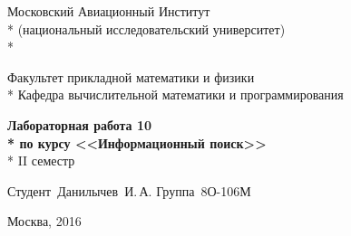 \begin{titlepage}

\newpage

\begin{center}
Московский Авиационный Институт \\*
(национальный исследовательский университет) \\*

\vspace{2em}

Факультет прикладной математики и физики \\*
Кафедра вычислительной математики и программирования

\vspace{20em}

\Large \textbf{Лабораторная работа 10 \\*
по курсу <<Информационный поиск>>} \\*
II семестр

\end{center}

\vspace{15em}

\hspace{30em}\vbox{
	\hbox{Студент Данилычев И.\,А.}
	\hbox{Группа 8О-106М}
}

\vspace{\fill}

\begin{center}
Москва, 2016
\end{center}

\end{titlepage}

